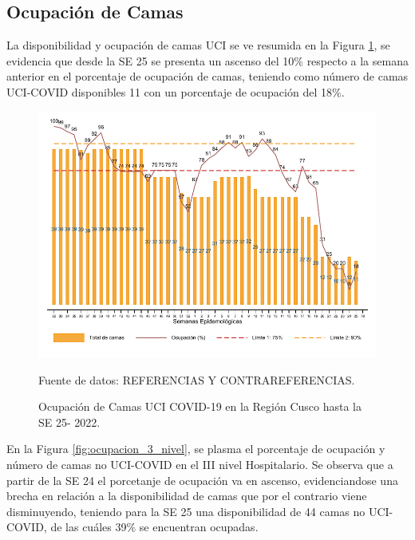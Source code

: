 \documentclass[12pt,a4paper,openany]{book}
\begin{document}
	
	
	\clearpage
	\subsection*{Ocupación de Camas}
	\noindent La disponibilidad y ocupación de camas UCI se ve resumida en la Figura \ref{fig:ocupacion_uci}, se evidencia que desde la SE 25 se presenta un ascenso del 10$\%$ respecto a la semana anterior en el porcentaje de ocupación de camas, teniendo como número de camas UCI-COVID disponibles   11 con un porcentaje de ocupación del 18$\%$.
	
	\begin{figure}[h]
		\caption{Ocupación de Camas UCI COVID-19 en la Región Cusco hasta la SE 25- 2022.}\label{fig:ocupacion_uci}
		\begin{center}
			\includegraphics[width=0.95\linewidth]{../figuras/uci.pdf}
		\end{center}
		{\footnotesize {Fuente de datos: REFERENCIAS Y CONTRAREFERENCIAS.}}
	\end{figure}
	\cleardoublepage
	
	En la Figura \ref{fig:ocupacion_3_nivel}, se plasma el porcentaje de ocupación y número de camas no UCI-COVID en el III nivel Hospitalario. Se observa que a partir de la SE 24 el porcetanje de ocupación va en ascenso, evidenciandose una brecha en relación a la disponibilidad de camas que por el contrario viene disminuyendo, teniendo para la SE 25 una disponibilidad de 44 camas no UCI-COVID, de las cuáles 39$\%$ se encuentran ocupadas.
	
\end{document}
